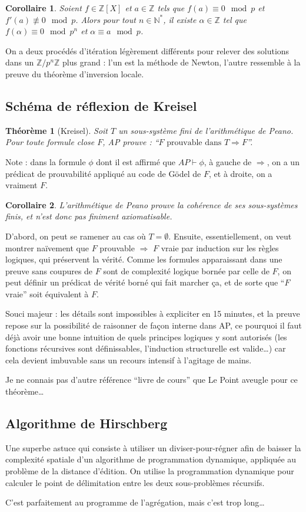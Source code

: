 \documentclass[a4paper, 11pt]{article}
\def\Z{\mathbb{Z}}
\def\N{\mathbb{N}}
\newtheorem*{theorem}{Théorème}
\newtheorem*{corollary}{Corollaire}
\begin{document}
\begin{corollary}
  Soient $f \in \Z[X]$ et $a \in \Z$ tels que $f(a) \equiv 0 \mod p$
  et $f'(a) \not\equiv 0 \mod p$. Alors pour tout $n \in \N^*$, il
  existe $\alpha \in \Z$ tel que $f(\alpha) \equiv 0 \mod p^n$ et
  $\alpha \equiv a \mod p$.
\end{corollary}

On a deux procédés d'itération légèrement différents pour relever des solutions
dans un $\Z/p^n\Z$ plus grand : l'un est la méthode de Newton, l'autre ressemble
à la preuve du théorème d'inversion locale.

\subsection{Schéma de réflexion de Kreisel}

\begin{theorem}[Kreisel]
  Soit $T$ un sous-système fini de l'arithmétique de Peano. Pour toute formule
  close $F$, AP prouve : \enquote{$F \text{ prouvable dans } T \Rightarrow F$}.
\end{theorem}
Note : dans la formule $\phi$ dont il est affirmé que $AP \vdash \phi$, à gauche
de $\Rightarrow$, on a un prédicat de prouvabilité appliqué au code de Gödel de
$F$, et à droite, on a vraiment $F$.
\begin{corollary}
  L'arithmétique de Peano prouve la cohérence de ses sous-systèmes finis, et
  n'est donc pas finiment axiomatisable.
\end{corollary}

D'abord, on peut se ramener au cas où $T = \emptyset$. Ensuite, essentiellement,
on veut montrer naïvement que $F$ prouvable $\Rightarrow$ $F$ vraie par
induction sur les règles logiques, qui préservent la vérité. Comme les formules
apparaissant dans une preuve sans coupures de $F$ sont de complexité logique
bornée par celle de $F$, on peut définir un prédicat de vérité borné qui fait
marcher ça, et de sorte que \enquote{$F$ vraie} soit équivalent à $F$.

Souci majeur : les détails sont impossibles à expliciter en 15 minutes, et la
preuve repose sur la possibilité de raisonner de façon interne dans AP, ce
pourquoi il faut déjà avoir une bonne intuition de quels principes logiques y
sont autorisés (les fonctions récursives sont définissables, l'induction
structurelle est valide…) car cela devient imbuvable sans un recours intensif à
l'agitage de mains.

Je ne connais pas d'autre référence \enquote{livre de cours} que Le Point
aveugle pour ce théorème…

\subsection{Algorithme de Hirschberg}

Une superbe astuce qui consiste à utiliser un diviser-pour-régner afin de
baisser la complexité spatiale d'un algorithme de programmation dynamique,
appliquée au problème de la distance d'édition. On utilise la programmation
dynamique pour calculer le point de délimitation entre les deux sous-problèmes
récursifs.

C'est parfaitement au programme de l'agrégation, mais c'est trop long…
\end{document}

